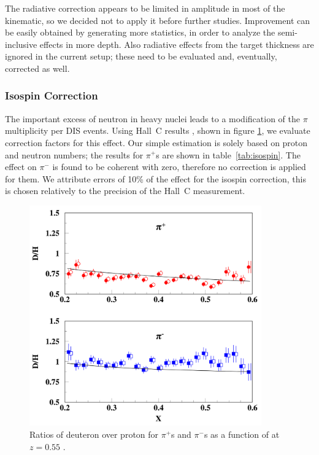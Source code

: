 The radiative correction appears to be limited in amplitude in most of the 
kinematic, so we decided not to apply it before further studies. Improvement can 
be easily obtained by generating more statistics, in order to analyze the 
semi-inclusive effects in more depth. Also radiative effects from the target thickness 
are ignored in the current setup; these need to be evaluated and, eventually, 
corrected as well.

\subsubsection{Isospin Correction}

The important excess of neutron in heavy nuclei leads to a modification of the 
$\pi$ multiplicity per DIS events. Using Hall~C results 
\cite{Asaturyan:2011mq}, shown in figure \ref{fig:IsoSpin}, we evaluate 
correction factors for this effect. Our simple estimation is solely based on 
proton and neutron numbers; the results for $\pi^+$s are shown in 
table~\ref{tab:isospin}. The effect on $\pi^-$ is found to be coherent with zero,
therefore no correction is applied for them. 
We attribute errors of 10\% of the effect for the isospin correction, this is chosen 
relatively to the precision of the Hall~C measurement.

\begin{figure}[tbp]
\centering
\includegraphics[width=10cm] {chap5-fig/HallC-Isospin.png}
\caption {Ratios of deuteron over proton for $\pi^+$s and $\pi^-$s 
as a function of \xb at $z=0.55$ \cite{Asaturyan:2011mq}.}
\label{fig:IsoSpin}
\end{figure}

